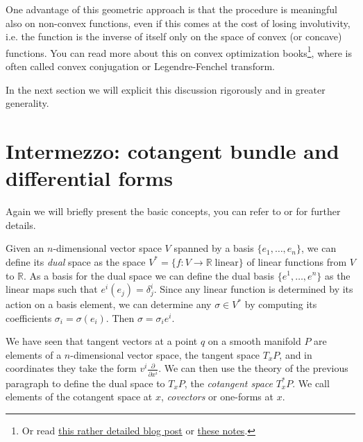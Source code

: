 \documentclass[english,fontsize=11pt,paper=a5,oneside]{scrbook}
\newcommand{\R}{\mathbb{R}}
\theoremstyle{definition}
\begin{document}
One advantage of this geometric approach is that the procedure is meaningful also on non-convex functions, even if this comes at the cost of losing involutivity, i.e. the function is the inverse of itself only on the space of convex (or concave) functions.
You can read more about this on convex optimization books\footnote{Or read \href{https://web.archive.org/web/20211127141805/https://jmanton.wordpress.com/2010/11/21/introduction-to-the-legendre-transform/}{this rather detailed blog post} or \href{https://web.archive.org/web/20170407134235/http://www.physics.sun.ac.za/~htouchette/archive/notes/lfth2.pdf}{these notes}.}, where is often called convex conjugation or Legendre-Fenchel transform.

In the next section we will explicit this discussion rigorously and in greater generality.

\section{Intermezzo: cotangent bundle and differential forms}

Again we will briefly present the basic concepts, you can refer to \cite{book:lee} or \cite[Chapters 5-7]{lectures:aom:seri} for further details.

Given an $n$-dimensional vector space $V$ spanned by a basis $\{e_1, \ldots, e_n\}$, we can define its \emph{dual} space as the space $V^* = \{f : V \to \R \; \mbox{linear}\}$ of linear functions from $V$ to $\R$.
As a basis for the dual space we can define the dual basis $\{e^1, \ldots, e^n\}$ as the linear maps such that $e^i(e_j) = \delta^i_j$. Since any linear function is determined by its action on a basis element, we can determine any $\sigma \in V^*$ by computing its coefficients $\sigma_i = \sigma(e_i)$. Then $\sigma = \sigma_i e^i$.

We have seen that tangent vectors at a point $q$ on a smooth manifold $P$ are elements of a $n$-dimensional vector space, the tangent space $T_x P$, and in coordinates they take the form $v^i \frac{\partial}{\partial x^i}$.
We can then use the theory of the previous paragraph to define the dual space to $T_x P$, the \emph{cotangent space} $T^*_x P$.
We call elements of the cotangent space at $x$, \emph{covectors} or one-forms at $x$.
\end{document}
